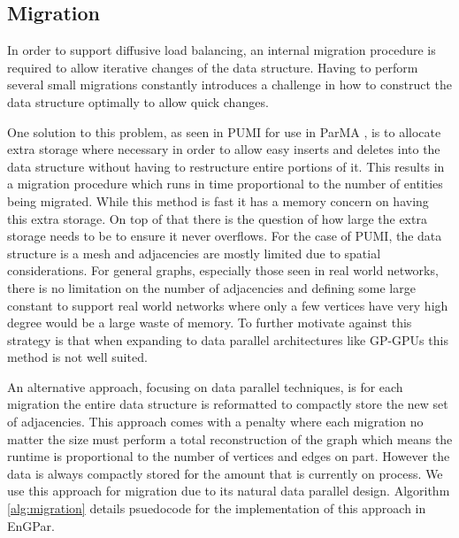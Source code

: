 \documentclass[a4paper]{article}
\begin{document}
\subsection{Migration}
In order to support diffusive load balancing, an internal migration procedure is required to allow iterative changes of the data structure. Having to perform several small migrations constantly introduces a challenge in how to construct the data structure optimally to allow quick changes.

One solution to this problem, as seen in PUMI for use in ParMA \cite{ibanez2016pumi}, is to allocate extra storage where necessary in order to allow easy inserts and deletes into the data structure without having to restructure entire portions of it. This results in a migration procedure which runs in time proportional to the number of entities being migrated. While this method is fast it has a memory concern on having this extra storage. On top of that there is the question of how large the extra storage needs to be to ensure it never overflows. For the case of PUMI, the data structure is a mesh and adjacencies are mostly limited due to spatial considerations. For general graphs, especially those seen in real world networks, there is no limitation on the number of adjacencies and defining some large constant to support real world networks where only a few vertices have very high degree would be a large waste of memory. To further motivate against this strategy is that when expanding to data parallel architectures like GP-GPUs this method is not well suited.

An alternative approach, focusing on data parallel techniques, is for each migration the entire data structure is reformatted to compactly store the new set of adjacencies. This approach comes with a penalty where each migration no matter the size must perform a total reconstruction of the graph which means the runtime is proportional to the number of vertices and edges on part. However the data is always compactly stored for the amount that is currently on process. We use this approach for migration due to its natural data parallel design. Algorithm \ref{alg:migration} details psuedocode for the implementation of this approach in EnGPar.
\newpage
\end{document}
